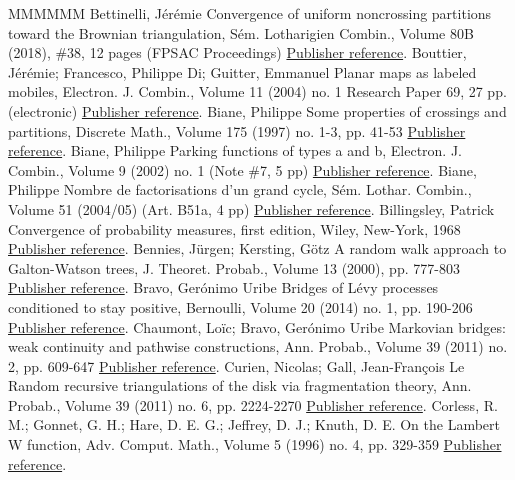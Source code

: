 \begin{thebibliography}{MMMMMM}
 Bettinelli, Jérémie Convergence of uniform noncrossing partitions toward the Brownian triangulation, Sém. Lotharigien Combin., Volume 80B (2018), \#38, 12 pages (FPSAC Proceedings) \href{https://ahl.centre-mersenne.org/item/AHL_2018__1__149_0/#Bet17}{Publisher reference}.
 Bouttier, Jérémie; Francesco, Philippe Di; Guitter, Emmanuel Planar maps as labeled mobiles, Electron. J. Combin., Volume 11 (2004) no. 1 Research Paper 69, 27 pp. (electronic) \href{https://ahl.centre-mersenne.org/item/AHL_2018__1__149_0/#BDFG04}{Publisher reference}.
 Biane, Philippe Some properties of crossings and partitions, Discrete Math., Volume 175 (1997) no. 1-3, pp. 41-53 \href{https://ahl.centre-mersenne.org/item/AHL_2018__1__149_0/#Biane1997}{Publisher reference}.
 Biane, Philippe Parking functions of types a and b, Electron. J. Combin., Volume 9 (2002) no. 1 (Note \#7, 5 pp) \href{https://ahl.centre-mersenne.org/item/AHL_2018__1__149_0/#Biane2002}{Publisher reference}.
 Biane, Philippe Nombre de factorisations d’un grand cycle, Sém. Lothar. Combin., Volume 51 (2004/05) (Art. B51a, 4 pp) \href{https://ahl.centre-mersenne.org/item/AHL_2018__1__149_0/#Biane2004}{Publisher reference}.
 Billingsley, Patrick Convergence of probability measures, first edition, Wiley, New-York, 1968 \href{https://ahl.centre-mersenne.org/item/AHL_2018__1__149_0/#Bil68}{Publisher reference}.
 Bennies, Jürgen; Kersting, Götz A random walk approach to Galton-Watson trees, J. Theoret. Probab., Volume 13 (2000), pp. 777-803 \href{https://ahl.centre-mersenne.org/item/AHL_2018__1__149_0/#BK00}{Publisher reference}.
 Bravo, Gerónimo Uribe Bridges of Lévy processes conditioned to stay positive, Bernoulli, Volume 20 (2014) no. 1, pp. 190-206 \href{https://ahl.centre-mersenne.org/item/AHL_2018__1__149_0/#UB14}{Publisher reference}.
 Chaumont, Loïc; Bravo, Gerónimo Uribe Markovian bridges: weak continuity and pathwise constructions, Ann. Probab., Volume 39 (2011) no. 2, pp. 609-647 \href{https://ahl.centre-mersenne.org/item/AHL_2018__1__149_0/#CUB11}{Publisher reference}.
 Curien, Nicolas; Gall, Jean-François Le Random recursive triangulations of the disk via fragmentation theory, Ann. Probab., Volume 39 (2011) no. 6, pp. 2224-2270 \href{https://ahl.centre-mersenne.org/item/AHL_2018__1__149_0/#CLGrecursive}{Publisher reference}.
 Corless, R. M.; Gonnet, G. H.; Hare, D. E. G.; Jeffrey, D. J.; Knuth, D. E. On the Lambert W function, Adv. Comput. Math., Volume 5 (1996) no. 4, pp. 329-359 \href{https://ahl.centre-mersenne.org/item/AHL_2018__1__149_0/#CGHJK96}{Publisher reference}.

\end{thebibliography}
